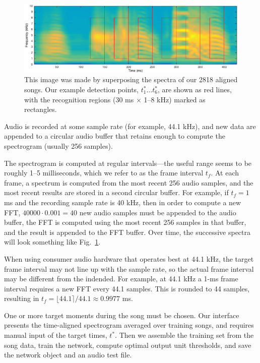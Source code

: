 \documentclass[10pt,letterpaper]{article}
\newcommand\fig[1]{Fig.~\ref{#1}}
\begin{document}
\begin{figure}
  \includegraphics[width=\textwidth]{6syllables}
  \caption{This image was made by superposing the spectra of our 2818 aligned songs.  Our example detection points, $t^*_1\ldots t^*_6$, are shown as red lines, with the recognition regions (30 ms $\times$ 1--8 kHz) marked as rectangles.}
  \label{fig:song}
\end{figure}

Audio is recorded at some sample rate (for example, 44.1 kHz), and new data are appended to a circular audio buffer that retains enough to compute the spectrogram (usually 256 samples).

The spectrogram is computed at regular intervals---the useful range
seems to be roughly 1--5 milliseconds, which we refer to as the frame
interval $t_f$.  At each frame, a spectrum is computed from the
most recent 256 audio samples, and the most recent results are stored in a second circular buffer.  For example, if $t_f=1$ ms and the recording sample rate is 40 kHz, then in order to compute a new FFT, $40000\cdot 0.001=40$ new audio samples must be appended to the audio buffer, the FFT is computed using the most recent 256 samples in that buffer, and the result is appended to the FFT buffer.  Over time, the successive spectra will look something
like \fig{fig:song}.

When using consumer audio hardware that operates best at 44.1 kHz, the target frame interval may not line up with the sample rate, so
the actual frame interval may be different from the indended.  For
example, at 44.1 kHz a 1-ms frame interval requires a new FFT
every 44.1 samples.  This is rounded to 44 samples, resulting in
$t_f=\lfloor 44.1 \rceil / 44.1 \approx 0.9977$ ms.

One or more target moments during the song must be chosen.  Our interface
presents the time-aligned spectrogram averaged over training songs,
and requires manual input of the target times, $t^*$.  Then we assemble the
training set from the song data, train the network, compute optimal
output unit thresholds, and save the network object and an audio test
file.
\end{document}
